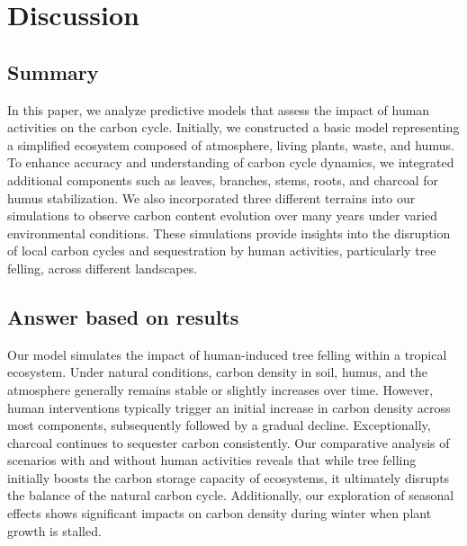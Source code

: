 \documentclass[a4paper]{article}
\begin{document}
    

\section{Discussion}
\subsection{Summary}
In this paper, we analyze predictive models that assess the impact of human activities on the carbon cycle. Initially, we constructed a basic model representing a simplified ecosystem composed of atmosphere, living plants, waste, and humus. To enhance accuracy and understanding of carbon cycle dynamics, we integrated additional components such as leaves, branches, stems, roots, and charcoal for humus stabilization. We also incorporated three different terrains into our simulations to observe carbon content evolution over many years under varied environmental conditions. These simulations provide insights into the disruption of local carbon cycles and sequestration by human activities, particularly tree felling, across different landscapes.

\subsection{Answer based on results}
Our model simulates the impact of human-induced tree felling within a tropical ecosystem. Under natural conditions, carbon density in soil, humus, and the atmosphere generally remains stable or slightly increases over time. However, human interventions typically trigger an initial increase in carbon density across most components, subsequently followed by a gradual decline. Exceptionally, charcoal continues to sequester carbon consistently. Our comparative analysis of scenarios with and without human activities reveals that while tree felling initially boosts the carbon storage capacity of ecosystems, it ultimately disrupts the balance of the natural carbon cycle. Additionally, our exploration of seasonal effects shows significant impacts on carbon density during winter when plant growth is stalled.
\end{document}
